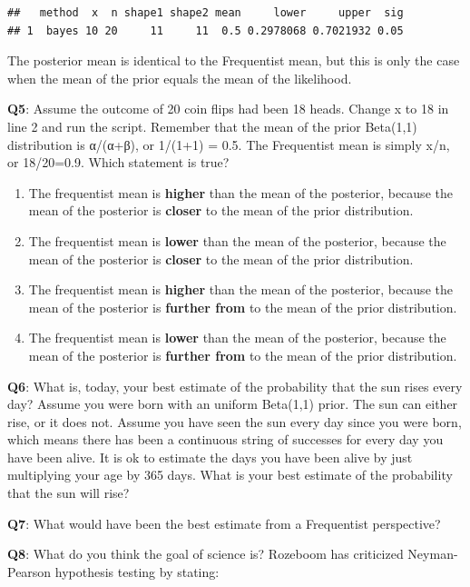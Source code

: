 \documentclass[
]{krantz}
\providecommand{\tightlist}{%
  \setlength{\itemsep}{0pt}\setlength{\parskip}{0pt}}
\begin{document}
\begin{verbatim}
##   method  x  n shape1 shape2 mean     lower     upper  sig
## 1  bayes 10 20     11     11  0.5 0.2978068 0.7021932 0.05
\end{verbatim}

The posterior mean is identical to the Frequentist mean, but this is only the case when the mean of the prior equals the mean of the likelihood.

\textbf{Q5}: Assume the outcome of 20 coin flips had been 18 heads. Change x to 18 in line 2 and run the script. Remember that the mean of the prior Beta(1,1) distribution is α/(α+β), or 1/(1+1) = 0.5. The Frequentist mean is simply x/n, or 18/20=0.9. Which statement is true?

\begin{enumerate}
\def\labelenumi{\Alph{enumi})}
\tightlist
\item
  The frequentist mean is \textbf{higher} than the mean of the posterior, because the mean of the posterior is \textbf{closer} to the mean of the prior distribution.
\item
  The frequentist mean is \textbf{lower} than the mean of the posterior, because the mean of the posterior is \textbf{closer} to the mean of the prior distribution.
\item
  The frequentist mean is \textbf{higher} than the mean of the posterior, because the mean of the posterior is \textbf{further from} to the mean of the prior distribution.
\item
  The frequentist mean is \textbf{lower} than the mean of the posterior, because the mean of the posterior is \textbf{further from} to the mean of the prior distribution.
\end{enumerate}

\textbf{Q6}: What is, today, your best estimate of the probability that the sun rises every day? Assume you were born with an uniform Beta(1,1) prior. The sun can either rise, or it does not. Assume you have seen the sun every day since you were born, which means there has been a continuous string of successes for every day you have been alive. It is ok to estimate the days you have been alive by just multiplying your age by 365 days. What is your best estimate of the probability that the sun will rise?

\textbf{Q7}: What would have been the best estimate from a Frequentist perspective?

\textbf{Q8}: What do you think the goal of science is? Rozeboom \citeyearpar{rozeboom_fallacy_1960} has criticized Neyman-Pearson hypothesis testing by stating:
\end{document}
